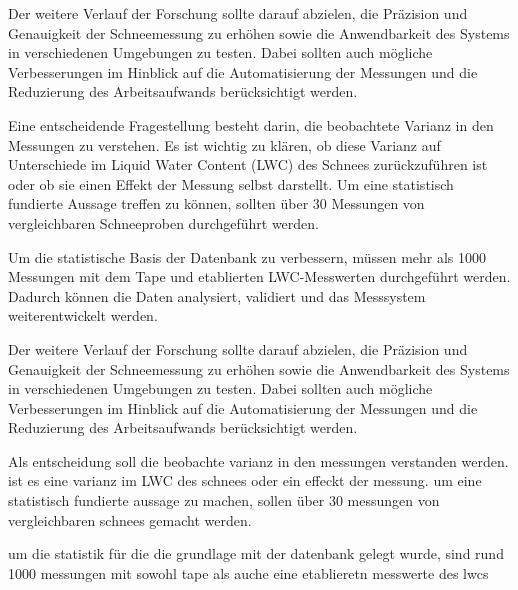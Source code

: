 Der weitere Verlauf der Forschung sollte darauf abzielen, die Präzision und Genauigkeit der Schneemessung zu erhöhen sowie die Anwendbarkeit des Systems in verschiedenen Umgebungen zu testen. Dabei sollten auch mögliche Verbesserungen im Hinblick auf die Automatisierung der Messungen und die Reduzierung des Arbeitsaufwands berücksichtigt werden.

Eine entscheidende Fragestellung besteht darin, die beobachtete Varianz in den Messungen zu verstehen. Es ist wichtig zu klären, ob diese Varianz auf Unterschiede im Liquid Water Content (LWC) des Schnees zurückzuführen ist oder ob sie einen Effekt der Messung selbst darstellt. Um eine statistisch fundierte Aussage treffen zu können, sollten über 30 Messungen von vergleichbaren Schneeproben durchgeführt werden.

Um die statistische Basis der Datenbank zu verbessern, müssen mehr als 1000 Messungen mit dem Tape und etablierten LWC-Messwerten durchgeführt werden. Dadurch können die Daten analysiert, validiert und das Messsystem weiterentwickelt werden.


Der weitere Verlauf der Forschung sollte darauf abzielen, die Präzision und Genauigkeit der Schneemessung zu erhöhen sowie die Anwendbarkeit des Systems in verschiedenen Umgebungen zu testen. Dabei sollten auch mögliche Verbesserungen im Hinblick auf die Automatisierung der Messungen und die Reduzierung des Arbeitsaufwands berücksichtigt werden.

Als entscheidung soll die beobachte varianz in den messungen verstanden werden. ist es eine varianz im LWC des schnees oder ein effeckt der messung. um eine statistisch fundierte aussage zu machen, sollen über 30 messungen von vergleichbaren schnees gemacht werden.

um die statistik für die die grundlage mit der datenbank gelegt wurde, sind rund 1000 messungen mit sowohl tape als auche eine etablieretn messwerte des lwcs
